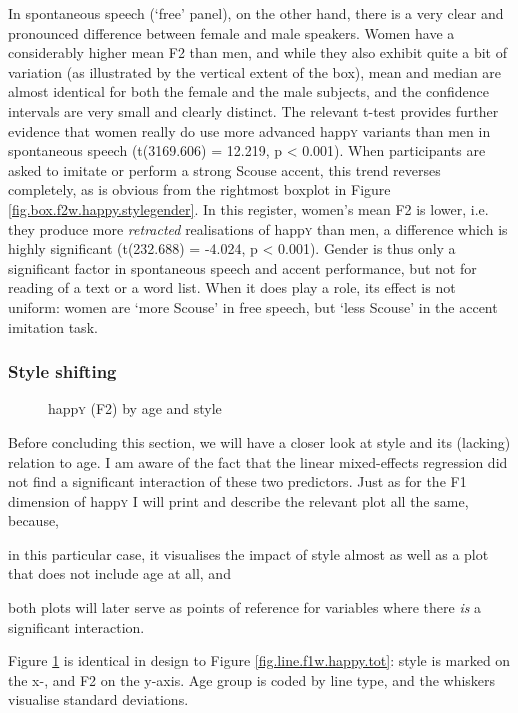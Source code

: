 In spontaneous speech (`free' panel), on the other hand, there is a very clear and pronounced difference between female and male speakers.
Women have a considerably higher mean F2 than men, and while they also exhibit quite a bit of variation (as illustrated by the vertical extent of the box), mean and median are almost identical for both the female and the male subjects, and the confidence intervals are very small and clearly distinct.
The relevant t-test provides further evidence that women really do use more advanced happ\textsc{y} variants than men in spontaneous speech (t(3169.606) = 12.219, p < 0.001).
When participants are asked to imitate or perform a strong Scouse accent, this trend reverses completely, as is obvious from the rightmost boxplot in Figure \ref{fig.box.f2w.happy.stylegender}.
In this register, women's mean F2 is lower, i.e. they produce more \emph{retracted} realisations of happ\textsc{y} than men, a difference which is highly significant (t(232.688) = -4.024, p < 0.001).
Gender is thus only a significant factor in spontaneous speech and accent performance, but not for reading of a text or a word list.
When it does play a role, its effect is not uniform: women are `more Scouse' in free speech, but `less Scouse' in the accent imitation task.

\subsubsection{Style shifting}
\label{sec.prod.res.vow.happy.f2.shifting}

\begin{figure}[h!]
	\centering
		\resizebox{.5\linewidth}{!}{} 
	\caption{happ\textsc{y} (F2) by age and style}
	\label{fig.line.f2w.happy.tot}
\end{figure}

Before concluding this section, we will have a closer look at style and its (lacking) relation to age.
I am aware  of the fact that the linear mixed-effects regression did not find a significant interaction of these two predictors.
Just as for the F1 dimension of happ\textsc{y} I will print and describe the relevant plot all the same, because,
\begin{inparaenum}[(a)]
	\item in this particular case, it visualises the impact of style almost as well as a plot that does not include age at all, and
	\item both plots will later serve as points of reference for variables where there \emph{is} a significant interaction.
\end{inparaenum}
Figure \ref{fig.line.f2w.happy.tot} is identical in design to Figure \ref{fig.line.f1w.happy.tot}: style is marked on the x-, and F2 on the y-axis.
Age group is coded by line type, and the whiskers visualise standard deviations.

